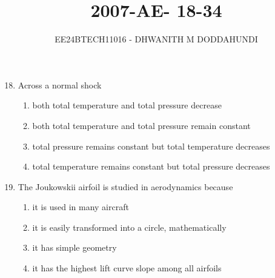 \documentclass[journal]{IEEEtran}
\begin{document}

\vspace{3cm}

\title{2007-AE- 18-34}
\author{EE24BTECH11016 - DHWANITH M DODDAHUNDI}

{\let\newpage\relax\maketitle}

\renewcommand{\thefigure}{\theenumi}
\renewcommand{\thetable}{\theenumi}
\setlength{\intextsep}{10pt} %

\begin{enumerate}
\setcounter{enumi}{17}

\item Across a normal shock
\begin{enumerate}
    \item both total temperature and total pressure decrease
    \item both total temperature and total pressure remain constant
    \item total pressure remains constant but total temperature decreases
    \item total temperature remains constant but total pressure decreases
\end{enumerate}

\item The Joukowskii airfoil is studied in aerodynamics because
\begin{enumerate}
    \item it is used in many aircraft
    \item it is easily transformed into a circle, mathematically
    \item it has simple geometry
    \item it has the highest lift curve slope among all airfoils
\end{enumerate}


\end{enumerate}
\end{document}
